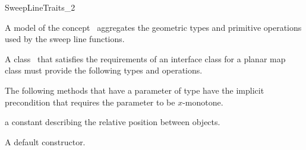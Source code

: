 

\begin{ccRefConcept}{SweepLineTraits_2}


\ccDefinition
  
A model of the concept \ccRefName\ aggregates the geometric types and
primitive operations used by the sweep line functions.


\ccTypes

  A class \ccClassTemplateName\ that satisfies the requirements of an
  interface class for a planar map class must provide the following types
  and operations. 

  
  The following methods that have a parameter of type  have the
  implicit precondition that requires the parameter to be $x$-monotone.


  {a constant describing the relative position between objects.}

\ccCreation
    

  {A default constructor.}


\ccOperations


\end{ccRefConcept}
